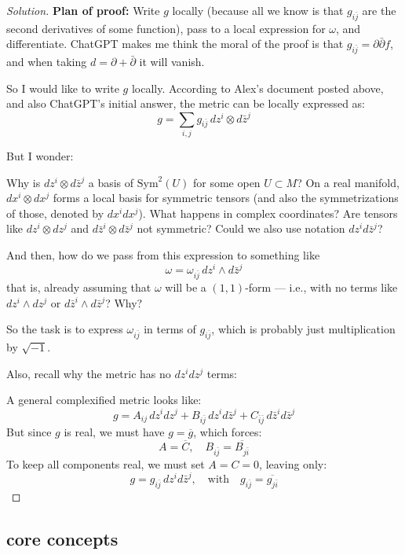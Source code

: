 \begin{proof}[Solution]\leavevmode
\textbf{Plan of proof:} Write \( g \) locally (because all we know is that \( g_{i\bar{j}} \) are the second derivatives of some function), pass to a local expression for \( \omega \), and differentiate. ChatGPT makes me think the moral of the proof is that \( g_{i\bar{j}} = \partial \bar{\partial} f \), and when taking \( d = \partial + \bar{\partial} \) it will vanish.

So I would like to write \( g \) locally. According to Alex’s document posted above, and also ChatGPT’s initial answer, the metric can be locally expressed as:
\[
g = \sum_{i,j} g_{i \bar{j}} \, dz^i \otimes d\bar{z}^j
\]

But I wonder:

Why is \( dz^i \otimes d\bar{z}^j \) a basis of \( \mathrm{Sym}^2(U) \) for some open \( U \subset M \)? On a real manifold, \( dx^i \otimes dx^j \) forms a local basis for symmetric tensors (and also the symmetrizations of those, denoted by \( dx^i dx^j \)). What happens in complex coordinates? Are tensors like \( dz^i \otimes dz^j \) and \( d\bar{z}^i \otimes d\bar{z}^j \) not symmetric? Could we also use notation \( dz^i d\bar{z}^j \)?

And then, how do we pass from this expression to something like
\[
\omega = \omega_{i \bar{j}} \, dz^i \wedge d\bar{z}^j
\]
that is, already assuming that \( \omega \) will be a \((1,1)\)-form — i.e., with no terms like \( dz^i \wedge dz^j \) or \( d\bar{z}^i \wedge d\bar{z}^j \)? Why?

So the task is to express \( \omega_{i \bar{j}} \) in terms of \( g_{i \bar{j}} \), which is probably just multiplication by \( \sqrt{-1} \).

\bigskip

Also, recall why the metric has no \( dz^i dz^j \) terms:

A general complexified metric looks like:
\[
g = A_{ij} \, dz^i dz^j + B_{i\bar{j}} \, dz^i d\bar{z}^j + C_{\bar{i} \bar{j}} \, d\bar{z}^i d\bar{z}^j
\]
But since \( g \) is real, we must have \( g = \overline{g} \), which forces:
\[
A = \overline{C}, \quad B_{i\bar{j}} = \overline{B_{j\bar{i}}}
\]
To keep all components real, we must set \( A = C = 0 \), leaving only:
\[
g = g_{i\bar{j}} \, dz^i d\bar{z}^j, \quad \text{with} \quad g_{i\bar{j}} = \overline{g_{j\bar{i}}}
\]
\end{proof}

\subsection{core concepts}

